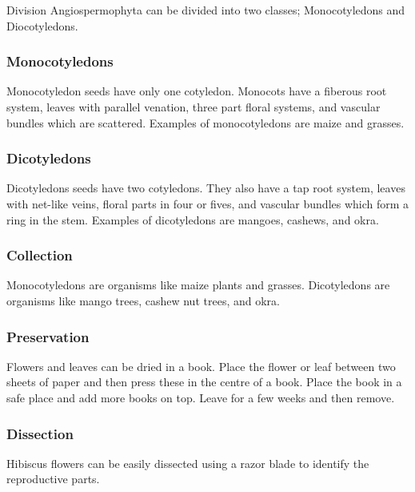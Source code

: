 Division Angiospermophyta can be divided into two classes; Monocotyledons and Diocotyledons.

\subsubsection*{\textbf{Monocotyledons}}
Monocotyledon seeds have only one cotyledon. Monocots have a fiberous root system, leaves with parallel venation, three part floral systems, and vascular bundles which are scattered. Examples of monocotyledons are maize and grasses.

\subsubsection*{\textbf{Dicotyledons}}
Dicotyledons seeds have two cotyledons. They also have a tap root system, leaves with net-like veins, floral parts in four or fives, and vascular bundles which form a ring in the stem. Examples of dicotyledons are mangoes, cashews, and okra.

\subsubsection{Collection}
Monocotyledons are organisms like maize plants and grasses. Dicotyledons are organisms like mango trees, cashew nut trees, and okra.

\subsubsection{Preservation} 
Flowers and leaves can be dried in a book. Place the flower or leaf between two sheets of paper and then press these in the centre of a book. Place the book in a safe place and add more books on top. Leave for a few weeks and then remove.

\subsubsection{Dissection}
Hibiscus flowers can be easily dissected using a razor blade to identify the reproductive parts.

